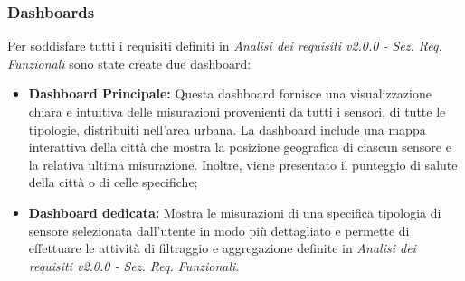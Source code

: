\subsubsection{Dashboards}
Per soddisfare tutti i requisiti definiti in \textit{Analisi dei requisiti v2.0.0 - Sez. Req. Funzionali} sono state create due dashboard:
\begin{itemize}
    \item \textbf{Dashboard Principale:} Questa dashboard fornisce una visualizzazione chiara e intuitiva delle misurazioni provenienti da tutti i sensori, di tutte le tipologie, distribuiti nell'area urbana. La dashboard include una mappa interattiva della città che mostra la posizione geografica di ciascun sensore e la relativa ultima misurazione. Inoltre, viene presentato il punteggio di salute della città o di celle specifiche;
    \item \textbf{Dashboard dedicata:} Mostra le misurazioni di una specifica tipologia di sensore selezionata dall'utente in modo più dettagliato e permette di effettuare le attività di filtraggio e aggregazione definite in \textit{Analisi dei requisiti v2.0.0 - Sez. Req. Funzionali}.
\end{itemize}




